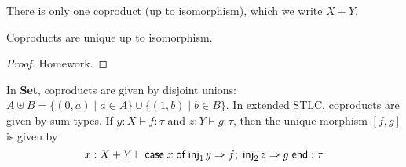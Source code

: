 \documentclass{lecturenotes}
\newcommand{\injl}[1]{\ensuremath{\textsf{inj}_1\mkern2mu#1}}
\newcommand{\injr}[1]{\ensuremath{\textsf{inj}_2\mkern3mu#1}}
\newcommand{\case}[5]{\ensuremath{\textsf{case}\mkern5mu#1\mkern5mu\textsf{of}\mkern5mu\injl{#2} \Rightarrow #3;\mkern5mu\injr{#4} \Rightarrow #5\mkern5mu\textsf{end}}}
\newcommand{\Set}{\textbf{Set}\xspace}
\newcommand{\coprodmor}[2]{\ensuremath{[ #1, #2 ]}}
\begin{document}
There is only one coproduct (up to isomorphism), which we write $X + Y$.
\begin{thm}
  Coproducts are unique up to isomorphism.
\end{thm}
\begin{proof}
  Homework.
\end{proof}

In \Set, coproducts are given by disjoint unions: $A \uplus B = \{(0, a) \mid a \in A\} \cup \{(1, b) \mid b \in B\}$.
In extended STLC, coproducts are given by sum types.
If $y : X \vdash f : \tau$ and $z : Y \vdash g : \tau$, then the unique morphism $\coprodmor{f}{g}$ is given by $$x : X + Y \vdash \case{x}{y}{f}{z}{g} : \tau$$
\end{document}
